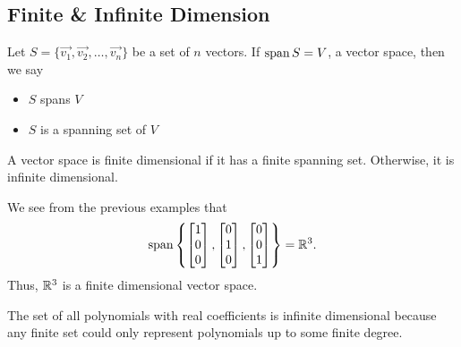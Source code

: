 \subsection{Finite \& Infinite Dimension}
\begin{definition}
	Let $S = \{\vec{v_1}, \vec{v_2}, \dots, \vec{v_n}\}$ be a set of $n$ vectors.
	If $\operatorname{span}{S} = V$, a vector space, then we say
	\begin{itemize}
		\item $S$ spans $V$
		\item $S$ is a spanning set of $V$
	\end{itemize}
\end{definition}

\begin{definition}
	A vector space is finite dimensional if it has a finite spanning set.
	Otherwise, it is infinite dimensional.
\end{definition}

\begin{example}
	We see from the previous examples that
	\begin{equation*}
		\operatorname{span}{\left\{\begin{bmatrix}
				1 \\ 0 \\ 0
			\end{bmatrix}, \begin{bmatrix}
				0 \\ 1 \\ 0	
			\end{bmatrix}, \begin{bmatrix}
				0 \\ 0 \\ 1
			\end{bmatrix}\right\}}= \mathbb{R}^3.
	\end{equation*}
	Thus, $\mathbb{R}^3$ is a finite dimensional vector space.
\end{example}
\begin{example}
	The set of all polynomials with real coefficients is infinite dimensional because any finite set could only represent polynomials up to some finite degree.
\end{example}